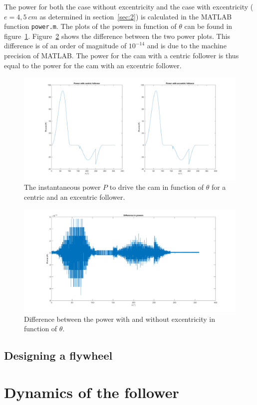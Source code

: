 \documentclass[a4paper]{article}
\begin{document}
The power for both the case without excentricity and the case with excentricity (\(e=4,5~cm\) as determined in section~\ref{sec:2}) is calculated in the MATLAB function \texttt{power.m}. The plots of the powers in function of \(\theta\) can be found in figure~\ref{fig:powerplot}. Figure~\ref{diffpower} shows the difference between the two power plots. This difference is of an order of magnitude of \(10^{-14}\) and is due to the machine precision of MATLAB. The power for the cam with a centric follower is thus equal to the power for the cam with an excentric follower.

\begin{figure}
	\centering
	\includegraphics[width=\textwidth]{powerplot.png}
	\caption{The instantaneous power \(P\) to drive the cam in function of \(\theta\) for a centric and an excentric follower.}
	\label{fig:powerplot}
	
\end{figure}

\begin{figure}
	\centering
	\includegraphics[width=\textwidth]{diffpower.png}
	\caption{Difference between the power with and without excentricity in function of \(\theta\).}
	\label{diffpower}
\end{figure}

\subsection{Designing a flywheel}

\section{Dynamics of the follower}



\end{document}
